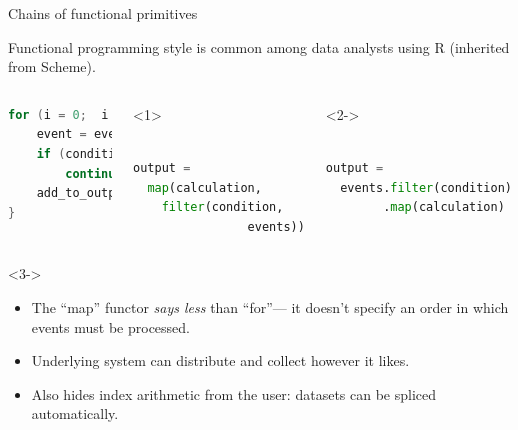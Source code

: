 \documentclass{beamer}
\begin{document}
\begin{frame}[fragile]{Chains of functional primitives}

Functional programming style is common among data analysts using R (inherited from Scheme).

\vspace{0.2 cm}

\vspace{0.2 cm}
\begin{columns}
\begin{lstlisting}[language=c,frame=single]
for (i = 0;  i < nEvents;  i++) {
    event = events(i);
    if (condition(event))
        continue;
    add_to_output(calculation(event));
}
\end{lstlisting}
\begin{onlyenv}<1>
\begin{lstlisting}[language=python,frame=single]

output = 
  map(calculation,
    filter(condition,
                events))

\end{lstlisting}
\end{onlyenv}
\begin{onlyenv}<2->
\begin{lstlisting}[language=python,frame=single]

output =
  events.filter(condition)
        .map(calculation)


\end{lstlisting}
\end{onlyenv}
\end{columns}

\begin{uncoverenv}<3->
\begin{itemize}
\item The ``map'' functor {\it says less} than ``for''--- it doesn't specify an order in which events must be processed.
\item Underlying system can distribute and collect however it likes.
\item Also hides index arithmetic from the user: datasets can be spliced automatically.
\end{itemize}
\end{uncoverenv}
\end{frame}
\end{document}
